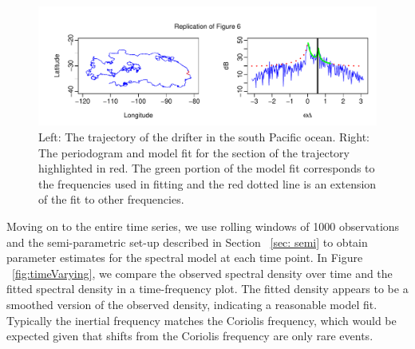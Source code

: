 \documentclass{stat572Style}
\begin{document}
\begin{figure}[h!]
  \centering
    \includegraphics[width=\textwidth]{ReplicatedFigures/fig6.pdf}
        \caption{Left: The trajectory of the drifter in the south Pacific ocean. Right: The periodogram and model fit for the section of the trajectory highlighted in red. The green portion of the model fit corresponds to the frequencies used in fitting and the red dotted line is an extension of the fit to other frequencies. }
        \label{fig: fig6}
\end{figure}

\par
Moving on to the entire time series, we use rolling windows of 1000 observations and the semi-parametric set-up described in Section ~\ref{sec: semi}  to obtain parameter estimates for the spectral model at each time point.
 In Figure ~\ref{fig:timeVarying}, we compare the observed spectral density over time and the fitted spectral density in a time-frequency plot. 
  The fitted density appears to be a smoothed version of the observed density,  indicating a reasonable model fit.
   Typically the inertial frequency matches the Coriolis frequency, which would be expected given that shifts from the Coriolis frequency are only rare events.
   
\end{document}
